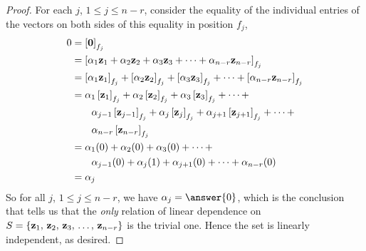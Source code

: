 \documentclass{ximera}
\begin{document}
\begin{theorem}
\begin{proof}
  For each $j$, $1\leq j\leq n-r$, consider the equality of the
  individual entries of the vectors on both sides of this equality in
  position $f_j$,
  \begin{align*}
    0
    &=\vectorentry{\zerovector}{f_j}\\
    &=\vectorentry{\lincombo{\alpha}{z}{n-r}}{f_j} \\ %
    &=
      \vectorentry{\alpha_1\vect{z}_1}{f_j}+
      \vectorentry{\alpha_2\vect{z}_2}{f_j}+
      \vectorentry{\alpha_3\vect{z}_3}{f_j}+
      \cdots+
      \vectorentry{\alpha_{n-r}\vect{z}_{n-r}}{f_j} \\ %
    &=
      \alpha_1\vectorentry{\vect{z}_1}{f_j}+
      \alpha_2\vectorentry{\vect{z}_2}{f_j}+
      \alpha_3\vectorentry{\vect{z}_3}{f_j}+
      \cdots+\\
    &\quad\quad
      \alpha_{j-1}\vectorentry{\vect{z}_{j-1}}{f_j}+
      \alpha_{j}\vectorentry{\vect{z}_j}{f_j}+
      \alpha_{j+1}\vectorentry{\vect{z}_{j+1}}{f_j}+
      \cdots+\\
    &\quad\quad
      \alpha_{n-r}\vectorentry{\vect{z}_{n-r}}{f_j} \\ %
    &=\alpha_1(0)+
      \alpha_2(0)+
      \alpha_3(0)+
      \cdots+\\
    &\quad\quad
      \alpha_{j-1}(0)+
      \alpha_{j}(1)+
      \alpha_{j+1}(0)+
      \cdots+\alpha_{n-r}(0) \\ %
    &=\alpha_{j}
  \end{align*}
  So for all $j$, $1\leq j\leq n-r$, we have $\alpha_j=\answer{0}$,
  which is the conclusion that tells us that the \textit{only}
  relation of linear dependence on $S=\left\{\mathbf{z}_{1},\,\mathbf{z}_{2},\,\mathbf{z}_{3},\,\ldots,\,\mathbf{z}_{n-r}\right\}$ is
  the trivial one.  Hence the set is linearly independent, as desired.
\end{proof}
\end{theorem}
\end{document}
